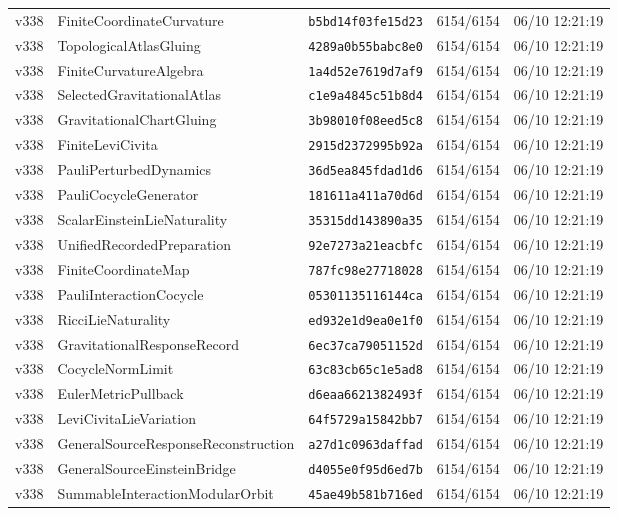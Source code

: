 \documentclass[11pt]{article}
\theoremstyle{definition}\newtheorem{deriv}{Derivation}
\begin{document}
{\begin{longtable}{@{}lllll@{}}
v338 & FiniteCoordinateCurvature & \texttt{b5bd14f03fe15d23} & 6154/6154 & 06/10 12:21:19 \\
v338 & TopologicalAtlasGluing & \texttt{4289a0b55babc8e0} & 6154/6154 & 06/10 12:21:19 \\
v338 & FiniteCurvatureAlgebra & \texttt{1a4d52e7619d7af9} & 6154/6154 & 06/10 12:21:19 \\
v338 & SelectedGravitationalAtlas & \texttt{c1e9a4845c51b8d4} & 6154/6154 & 06/10 12:21:19 \\
v338 & GravitationalChartGluing & \texttt{3b98010f08eed5c8} & 6154/6154 & 06/10 12:21:19 \\
v338 & FiniteLeviCivita & \texttt{2915d2372995b92a} & 6154/6154 & 06/10 12:21:19 \\
v338 & PauliPerturbedDynamics & \texttt{36d5ea845fdad1d6} & 6154/6154 & 06/10 12:21:19 \\
v338 & PauliCocycleGenerator & \texttt{181611a411a70d6d} & 6154/6154 & 06/10 12:21:19 \\
v338 & ScalarEinsteinLieNaturality & \texttt{35315dd143890a35} & 6154/6154 & 06/10 12:21:19 \\
v338 & UnifiedRecordedPreparation & \texttt{92e7273a21eacbfc} & 6154/6154 & 06/10 12:21:19 \\
v338 & FiniteCoordinateMap & \texttt{787fc98e27718028} & 6154/6154 & 06/10 12:21:19 \\
v338 & PauliInteractionCocycle & \texttt{05301135116144ca} & 6154/6154 & 06/10 12:21:19 \\
v338 & RicciLieNaturality & \texttt{ed932e1d9ea0e1f0} & 6154/6154 & 06/10 12:21:19 \\
v338 & GravitationalResponseRecord & \texttt{6ec37ca79051152d} & 6154/6154 & 06/10 12:21:19 \\
v338 & CocycleNormLimit & \texttt{63c83cb65c1e5ad8} & 6154/6154 & 06/10 12:21:19 \\
v338 & EulerMetricPullback & \texttt{d6eaa6621382493f} & 6154/6154 & 06/10 12:21:19 \\
v338 & LeviCivitaLieVariation & \texttt{64f5729a15842bb7} & 6154/6154 & 06/10 12:21:19 \\
v338 & GeneralSourceResponseReconstruction & \texttt{a27d1c0963daffad} & 6154/6154 & 06/10 12:21:19 \\
v338 & GeneralSourceEinsteinBridge & \texttt{d4055e0f95d6ed7b} & 6154/6154 & 06/10 12:21:19 \\
v338 & SummableInteractionModularOrbit & \texttt{45ae49b581b716ed} & 6154/6154 & 06/10 12:21:19 \\

\end{longtable}}
\end{document}
